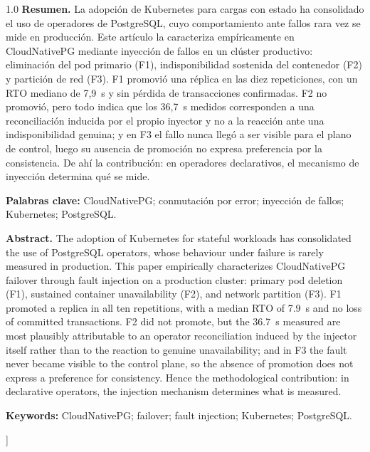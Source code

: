 \documentclass[12pt,twocolumn,letterpaper]{article}
\begin{document}
{\begin{@twocolumnfalse}
\vspace{1em}
\begin{spacing}{1.0}
\noindent\textbf{Resumen.}\; \small\justifying
La adopción de Kubernetes para cargas con estado ha consolidado el uso de operadores de PostgreSQL, cuyo comportamiento ante fallos rara vez se mide en producción. Este artículo la caracteriza empíricamente en CloudNativePG mediante inyección de fallos en un clúster productivo: eliminación del pod primario (F1), indisponibilidad sostenida del contenedor (F2) y partición de red (F3). F1 promovió una réplica en las diez repeticiones, con un RTO mediano de 7,9~s y sin pérdida de transacciones confirmadas. F2 no promovió, pero todo indica que los 36,7~s medidos corresponden a una reconciliación inducida por el propio inyector y no a la reacción ante una indisponibilidad genuina; y en F3 el fallo nunca llegó a ser visible para el plano de control, luego su ausencia de promoción no expresa preferencia por la consistencia. De ahí la contribución: en operadores declarativos, el mecanismo de inyección determina qué se mide.
\par\vspace{0.5em}
\noindent\textbf{\small Palabras clave:}\; {\small CloudNativePG; conmutación por error; inyección de fallos; Kubernetes; PostgreSQL.}
\par\vspace{0.8em}
\noindent\textbf{Abstract.}\; \small\justifying
The adoption of Kubernetes for stateful workloads has consolidated the use of PostgreSQL operators, whose behaviour under failure is rarely measured in production. This paper empirically characterizes CloudNativePG failover through fault injection on a production cluster: primary pod deletion (F1), sustained container unavailability (F2), and network partition (F3). F1 promoted a replica in all ten repetitions, with a median RTO of 7.9~s and no loss of committed transactions. F2 did not promote, but the 36.7~s measured are most plausibly attributable to an operator reconciliation induced by the injector itself rather than to the reaction to genuine unavailability; and in F3 the fault never became visible to the control plane, so the absence of promotion does not express a preference for consistency. Hence the methodological contribution: in declarative operators, the injection mechanism determines what is measured.
\par\vspace{0.5em}
\noindent\textbf{\small Keywords:}\; {\small CloudNativePG; failover; fault injection; Kubernetes; PostgreSQL.}
\end{spacing}
\vspace{1.4em}
\end{@twocolumnfalse}
}]
\end{document}
